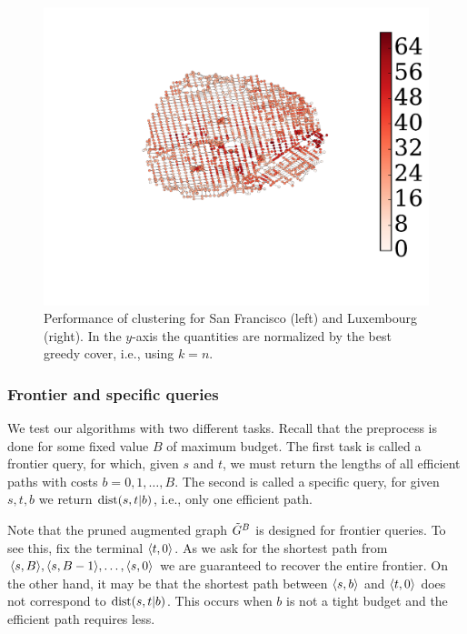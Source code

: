 \begin{figure}

\includegraphics[clip, trim=14cm 3cm 3cm 3cm,scale=0.1]{TexImg/SF_hub_sizes.pdf}

\caption{Performance of clustering for San Francisco (left) and Luxembourg (right). In the $y$-axis the quantities are normalized by the best greedy cover, i.e., using $k=n$.}
\label{fig:clusters}
\end{figure}

\subsubsection{Frontier and specific queries}

We test our algorithms with two different tasks.
Recall that the preprocess is done for some fixed value $B$ of maximum budget.
The first task is called a frontier query, for which, given $s$ and $t$, we must return the lengths of all efficient paths with costs $b=0,1,\ldots,B$.
The second is called a specific query, for given $s,t,b$ we return $\text{dist}(s,t|b)$, i.e., only one efficient path.

Note that the pruned augmented graph $\tilde G^B$ is designed for frontier queries.
To see this, fix the terminal $\langle t,0\rangle$.
As we ask for the shortest path from $\langle s,B\rangle,\langle s,B-1\rangle,\ldots,\langle s,0\rangle$ we are guaranteed to recover the entire frontier.
On the other hand, it may be that the shortest path between $\langle s,b\rangle$ and $\langle t,0\rangle$ does not correspond to $\text{dist}(s,t|b)$.
This occurs when $b$ is not a tight budget and the efficient path requires less.

